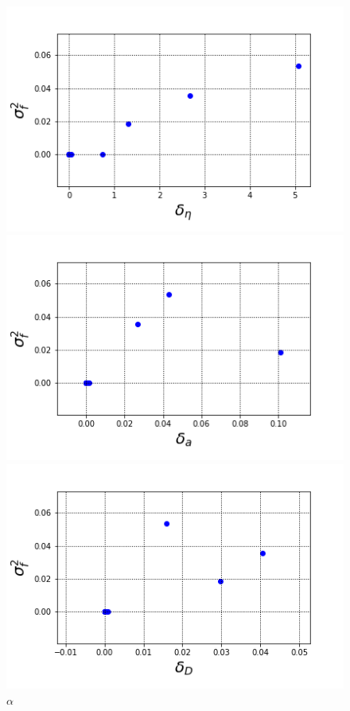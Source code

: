 \documentclass[16.7pt]{jsarticle}
\begin{document}
		\begin{figure}[h]
			\centering
			\begin{minipage}{0.45\hsize}
				\centering
				\includegraphics[width= 0.85\columnwidth]{./figure/vars_OmgEta.png}
				\caption{$ \omega_{\eta} $}
			\end{minipage}
			\begin{minipage}{0.45\hsize}
				\centering
				\includegraphics[width= 0.85\columnwidth]{./figure/vars_Alpha.png}
				\caption{$ \alpha $}
			\end{minipage}
			\begin{minipage}{0.45\hsize}
				\centering
				\includegraphics[width= 0.85\columnwidth]{./figure/vars_Dist.png}

\end{minipage}
\end{figure}
\end{document}

